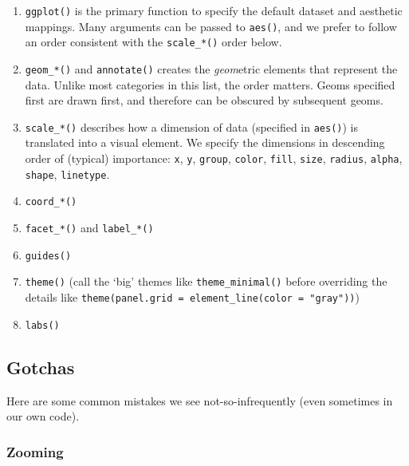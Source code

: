 \documentclass[
]{book}
\providecommand{\tightlist}{%
  \setlength{\itemsep}{0pt}\setlength{\parskip}{0pt}}
\begin{document}
\begin{enumerate}
\def\labelenumi{\arabic{enumi}.}
\tightlist
\item
  \texttt{ggplot()} is the primary function to specify the default dataset and aesthetic mappings. Many arguments can be passed to \texttt{aes()}, and we prefer to follow an order consistent with the \texttt{scale\_*()} order below.
\item
  \texttt{geom\_*()} and \texttt{annotate()} creates the \emph{geom}etric elements that represent the data. Unlike most categories in this list, the order matters. Geoms specified first are drawn first, and therefore can be obscured by subsequent geoms.
\item
  \texttt{scale\_*()} describes how a dimension of data (specified in \texttt{aes()}) is translated into a visual element. We specify the dimensions in descending order of (typical) importance: \texttt{x}, \texttt{y}, \texttt{group}, \texttt{color}, \texttt{fill}, \texttt{size}, \texttt{radius}, \texttt{alpha}, \texttt{shape}, \texttt{linetype}.
\item
  \texttt{coord\_*()}
\item
  \texttt{facet\_*()} and \texttt{label\_*()}
\item
  \texttt{guides()}
\item
  \texttt{theme()} (call the `big' themes like \texttt{theme\_minimal()} before overriding the details like \texttt{theme(panel.grid\ =\ element\_line(color\ =\ "gray"))})
\item
  \texttt{labs()}
\end{enumerate}

\hypertarget{style-ggplot-gotchas}{%
\subsection{Gotchas}\label{style-ggplot-gotchas}}

Here are some common mistakes we see not-so-infrequently (even sometimes in our own code).

\hypertarget{style-ggplot-zoom}{%
\subsubsection{Zooming}\label{style-ggplot-zoom}}
\end{document}
